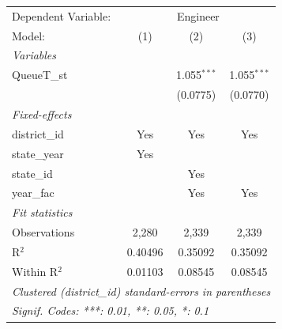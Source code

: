 
\begingroup
\centering
\begin{tabular}{lccc}
   \tabularnewline \midrule \midrule
   Dependent Variable: & \multicolumn{3}{c}{Engineer}\\
   Model:        & (1)     & (2)           & (3)\\  
   \midrule
   \emph{Variables}\\
   QueueT\_st    &         & 1.055$^{***}$ & 1.055$^{***}$\\   
                 &         & (0.0775)      & (0.0770)\\   
   \midrule
   \emph{Fixed-effects}\\
   district\_id  & Yes     & Yes           & Yes\\  
   state\_year   & Yes     &               & \\  
   state\_id     &         & Yes           & \\  
   year\_fac     &         & Yes           & Yes\\  
   \midrule
   \emph{Fit statistics}\\
   Observations  & 2,280   & 2,339         & 2,339\\  
   R$^2$         & 0.40496 & 0.35092       & 0.35092\\  
   Within R$^2$  & 0.01103 & 0.08545       & 0.08545\\  
   \midrule \midrule
   \multicolumn{4}{l}{\emph{Clustered (district\_id) standard-errors in parentheses}}\\
   \multicolumn{4}{l}{\emph{Signif. Codes: ***: 0.01, **: 0.05, *: 0.1}}\\
\end{tabular}
\par\endgroup



